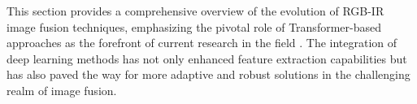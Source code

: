 This section provides a comprehensive overview of the evolution of RGB-IR image fusion techniques, emphasizing the pivotal role of Transformer-based approaches as the forefront of current research in the field \cite{vs2022image, zhao2021dndt, fu2021ppt, wang2022swinfuse}. The integration of deep learning methods has not only enhanced feature extraction capabilities but has also paved the way for more adaptive and robust solutions in the challenging realm of image fusion.